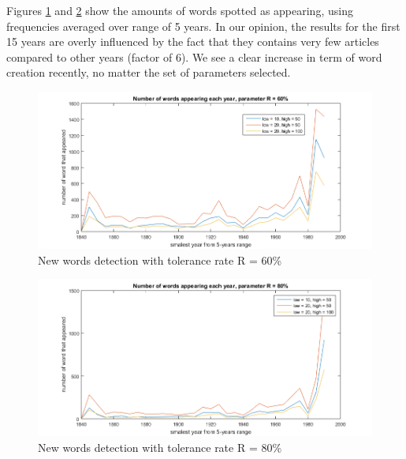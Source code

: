 Figures \ref{ratio60} and \ref{ratio80} show the amounts of words spotted as appearing, using frequencies averaged over range of 5 years. In our opinion, the results for the first 15 years are overly influenced by the fact that they contains very few articles compared to other years (factor of 6). We see a clear increase in term of word creation recently, no matter the set of parameters selected. 
\begin{figure}[H]
        \includegraphics[scale=0.65]{Pictures/statistics/appearing-words/word-appearing-ratio60.png}
        \caption{New words detection with tolerance rate R = 60\%}
        \label{ratio60}
	\centering
\end{figure}
\begin{figure}[H]
        \includegraphics[scale=0.65]{Pictures/statistics/appearing-words/word-appearing-ratio80.png}
        \caption{New words detection with tolerance rate R = 80\%}
        \label{ratio80}
	\centering
\end{figure}
